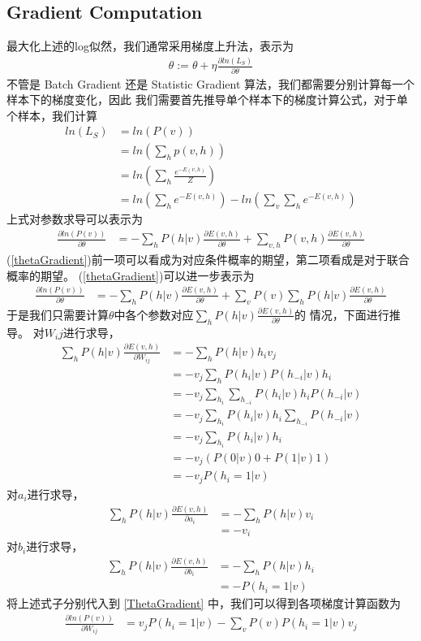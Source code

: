 \documentclass[UTF8]{ctexart}
\begin{document}
\subsection{Gradient Computation}
最大化上述的log似然，我们通常采用梯度上升法，表示为
\begin{align}
\theta := \theta + \eta \frac{\partial ln(L_S)}{\partial \theta}
\end{align}
不管是 Batch Gradient 还是 Statistic Gradient 算法，我们都需要分别计算每一个样本下的梯度变化，因此
我们需要首先推导单个样本下的梯度计算公式，对于单个样本，我们计算
\begin{align}
ln(L_S) &= ln(P(v))
\\
&= ln(\sum_h p(v, h)) 
\\
&= ln(\sum_h \frac{e^{-E(v, h)}}{Z})
\\
&= ln(\sum_h e^{-E(v, h)}) - ln(\sum_v \sum_h e^{-E(v, h)})
\end{align}
上式对参数求导可以表示为
\begin{align}
\label{thetaGradient}
\frac{\partial ln(P(v))}{\partial \theta} 
&= -\sum_h P(h|v) \frac{\partial E(v, h)}{\partial \theta} + 
\sum_{v,h} P(v, h) \frac{\partial E(v, h)}{\partial \theta}
\end{align}
(\ref{thetaGradient})前一项可以看成为对应条件概率的期望，第二项看成是对于联合概率的期望。
(\ref{thetaGradient})可以进一步表示为
\begin{align}
\label{ThetaGradient}
\frac{\partial ln(P(v))}{\partial \theta} 
&= -\sum_h P(h|v) \frac{\partial E(v, h)}{\partial \theta} + 
\sum_v P(v) \sum_h P(h|v) \frac{\partial E(v, h)}{\partial \theta}
\end{align}
于是我们只需要计算$\theta$中各个参数对应$\sum_h P(h|v) \frac{\partial E(v, h)}{\partial \theta}$的
情况，下面进行推导。
对$W_ij$进行求导，
\begin{align}
\label{wGradient}
\sum_h P(h|v) \frac{\partial E(v, h)}{\partial W_{ij}} &=
- \sum_h P(h|v)h_i v_j \\
&= - v_j \sum_h P(h_i|v)P(h_{-i}|v) h_i \\
&= - v_j \sum_{h_i} \sum_{h_{-i}} P(h_i|v)h_i P(h_{-i}|v) \\
&= - v_j \sum_{h_i} P(h_i|v)h_i \sum_{h_{-i}} P(h_{-i}|v) \\
&= - v_j \sum_{h_i} P(h_i|v)h_i \\
&= - v_j (P(0|v)0 + P(1|v)1) \\
&= - v_j P(h_i=1|v)
\end{align}
对$a_i$进行求导，
\begin{align}
\sum_h P(h|v)\frac{\partial E(v, h)}{\partial a_i} &=
- \sum_h P(h|v) v_i \\
&= - v_i
\end{align}
对$b_i$进行求导，
\begin{align}
\sum_h P(h|v)\frac{\partial E(v, h)}{\partial b_i} &=
- \sum_h P(h|v) h_i \\
&= - P(h_i=1|v)
\end{align}
将上述式子分别代入到 \ref{ThetaGradient} 中，我们可以得到各项梯度计算函数为
\begin{align}
\label{Wgradient}
\frac{\partial ln(P(v))}{\partial W_{ij}} 
&= v_jP(h_i=1|v) - \sum_v P(v) P(h_i=1|v)v_j
\end{align}
\end{document}
